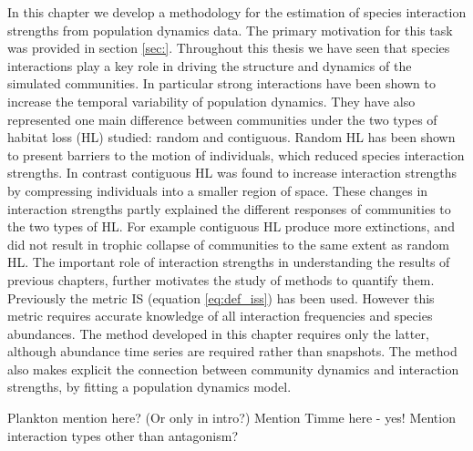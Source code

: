 In this chapter we develop a methodology for the estimation of species interaction strengths from population dynamics data. The primary motivation for this task was provided in section \ref{sec:}. Throughout this thesis we have seen that species interactions play a key role in driving the structure and dynamics of the simulated communities. In particular strong interactions have been shown to increase the temporal variability of population dynamics. They have also represented one main difference between communities under the two types of habitat loss (HL) studied: random and contiguous. Random HL has been shown to present barriers to the motion of individuals, which reduced species interaction strengths. In contrast contiguous HL was found to increase interaction strengths by compressing individuals into a smaller region of space. These changes in interaction strengths partly explained the different responses of communities to the two types of HL. For example contiguous HL produce more extinctions, and did not result in trophic collapse of communities to the same extent as random HL. The important role of interaction strengths in understanding the results of previous chapters, further motivates the study of methods to quantify them. Previously the metric IS (equation \eqref{eq:def_iss}) has been used. However this metric requires accurate knowledge of all interaction frequencies and species abundances. The method developed in this chapter requires only the latter, although abundance time series are required rather than snapshots. The method also makes explicit the connection between community dynamics and interaction strengths, by fitting a population dynamics model.   

Plankton mention here? (Or only in intro?) Mention Timme here - yes! Mention interaction types other than antagonism?

